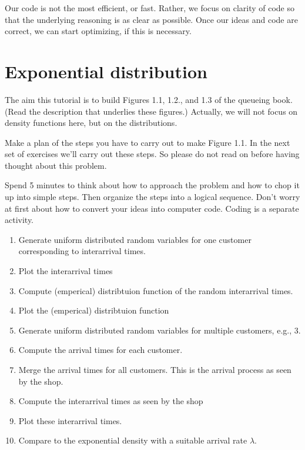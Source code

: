 \documentclass{scrartcl}
\begin{document}
Our code is not the most efficient, or fast. Rather, we focus on clarity of code so that the underlying reasoning is as clear as possible. Once our ideas and code are correct, we can start optimizing, if this is necessary. 

\section{Exponential distribution}

The aim this tutorial is to build Figures 1.1, 1.2., and 1.3 of the queueing book.  (Read the description that underlies these figures.) Actually, we will not focus on  density functions here, but on the distributions.  

\begin{exercise}
  Make a plan of the steps you have to carry out to make Figure 1.1. In the next set of exercises we'll carry out these steps. So please do not read on before having thought about this problem. 
  \begin{hint}
Spend 5 minutes to think about how to approach the problem and how to chop it up into simple steps. Then organize the steps into a logical sequence. Don't worry at first about how to convert your ideas into computer code.   Coding is a separate activity. 
  \end{hint}
  \begin{solution}
    \begin{enumerate}
    \item Generate  uniform distributed random variables for one customer corresponding to interarrival times.
    \item Plot the interarrival times
    \item Compute (emperical) distribtuion function of the random interarrival times.
    \item Plot the (emperical) distribtuion function
    \item Generate  uniform distributed random variables for multiple customers, e.g., 3. 
    \item Compute the arrival times for each customer.
    \item Merge  the arrival times for all customers. This is the arrival process as seen by the shop.
    \item Compute the interarrival times as seen by the shop
    \item Plot these interarrival times.
    \item Compare to the exponential density with a suitable arrival rate $\lambda$. 
    \end{enumerate}
  \end{solution}
\end{exercise}
\end{document}
